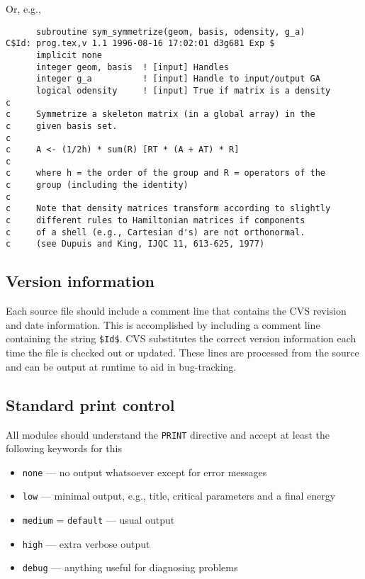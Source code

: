 Or, e.g.,
\begin{verbatim}
      subroutine sym_symmetrize(geom, basis, odensity, g_a)
C$Id: prog.tex,v 1.1 1996-08-16 17:02:01 d3g681 Exp $
      implicit none
      integer geom, basis  ! [input] Handles
      integer g_a          ! [input] Handle to input/output GA
      logical odensity     ! [input] True if matrix is a density
c
c     Symmetrize a skeleton matrix (in a global array) in the
c     given basis set.
c
c     A <- (1/2h) * sum(R) [RT * (A + AT) * R]
c
c     where h = the order of the group and R = operators of the
c     group (including the identity)
c
c     Note that density matrices transform according to slightly
c     different rules to Hamiltonian matrices if components
c     of a shell (e.g., Cartesian d's) are not orthonormal.
c     (see Dupuis and King, IJQC 11, 613-625, 1977)
\end{verbatim}


\subsection{Version information}

Each source file should include a comment line that contains the CVS
revision and date information.  This is accomplished by including a
comment line containing the string \verb+$+\verb+Id+\verb+$+.  CVS
substitutes the correct version information each time the file is
checked out or updated.  These lines are processed from the source and can be
output at runtime to aid in bug-tracking.

\subsection{Standard print control}

All modules should understand the \verb+PRINT+ directive and
accept at least the following keywords for this
\begin{itemize}
\item \verb+none+ --- no output whatsoever except for error messages
\item \verb+low+ --- minimal output, e.g., title, critical parameters
and a final energy
\item \verb+medium+ = \verb+default+ --- usual output
\item \verb+high+ --- extra verbose output
\item \verb+debug+ --- anything useful for diagnosing problems
\end{itemize}

